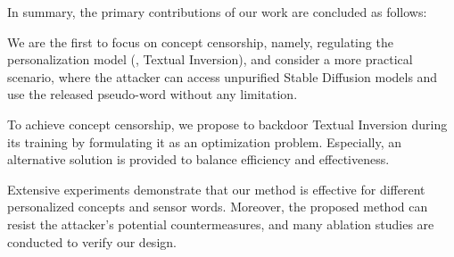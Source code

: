 In summary, the primary contributions of our work are concluded as follows:

\begin{packeditemize}

    \item We are the first to focus on concept censorship, namely, regulating the personalization model (\ie, Textual Inversion), and consider a more practical scenario, where the attacker can access unpurified Stable Diffusion models and use the released pseudo-word without any limitation.

    \item To achieve concept censorship, we propose to backdoor Textual Inversion during its training by formulating it as an optimization problem. Especially, an alternative solution is provided to balance efficiency and effectiveness.

    \item Extensive experiments demonstrate that our method is effective for different personalized concepts and sensor words. Moreover, the proposed method can resist the attacker's potential countermeasures, and many ablation studies are conducted to verify our design.

\end{packeditemize}  

